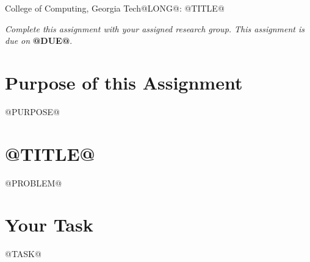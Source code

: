 \documentclass[11pt]{article}
\begin{document}


{College of Computing, Georgia Tech}{@LONG@: @TITLE@}

{\em Complete this assignment with your assigned research group.  This
  assignment is due on} {\bf @DUE@}.

\section{Purpose of this Assignment}

@PURPOSE@

\section{@TITLE@}

@PROBLEM@

\section{Your Task}

@TASK@
\end{document}
